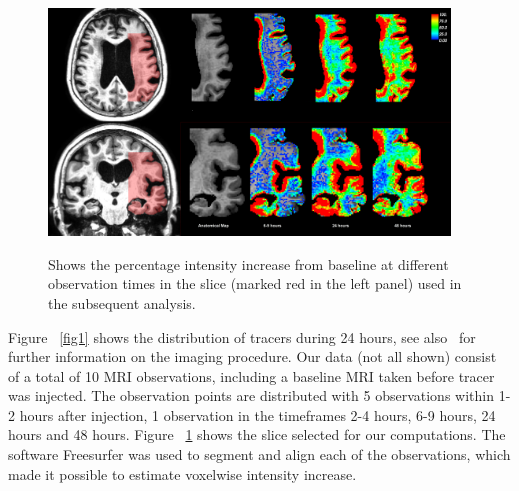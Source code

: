 \documentclass[11pt,a4paper]{article}
\begin{document}
\begin{figure}
\includegraphics[width=0.95\textwidth]{Zoom-PatID-68.png} 
\label{fig2} 
\caption{Shows the percentage intensity increase from baseline at different observation times in the slice (marked red in the left panel) used in the subsequent analysis.}
\end{figure}
Figure ~\ref{fig1} shows the distribution of tracers during 24 hours, see also~\cite{ringstad2018brain} for further information on the imaging procedure.   
Our data (not all shown) consist of a total of 10 MRI observations, including a baseline MRI taken before tracer was injected. The observation points are distributed with 5 observations within 1-2 hours after injection, 1 observation in the timeframes 2-4 hours, 6-9 hours, 24 hours and 48 hours. 
Figure ~\ref{fig2} shows the slice selected for our computations. 
The software Freesurfer was used to segment and align each of the observations, which made it possible to estimate voxelwise intensity increase. 
\end{document}

